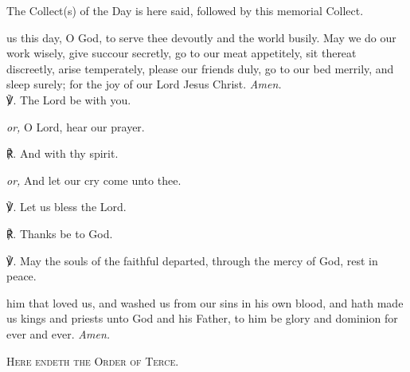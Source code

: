 \begin{multicols}{2}




\begin{rubric}
	The Collect(s) of the Day is here said, followed by this memorial Collect.
\end{rubric}

 us this day, O God, to serve thee devoutly and the world busily. May we do our work wisely, give succour secretly, go to our meat appetitely, sit thereat discreetly, arise temperately, please our friends duly, go to our bed merrily, and sleep surely; for the joy of our Lord Jesus Christ. \textit{Amen.}\\

℣. The Lord be with you.\par
\textit{or,} O Lord, hear our prayer.\par
℟. And with thy spirit.\par
\textit{or,} And let our cry come unto thee.\par
℣. Let us bless the Lord.\par
℟. Thanks be to God.\par
℣. May the souls {} of the faithful departed, through the mercy of God, rest in peace.

 him that loved us, and washed us from our sins in his own blood, and hath made us kings and priests unto God and his Father, to him be glory and dominion for ever and ever. \textit{Amen.}



\end{multicols}

\begin{center}
	{\textsc{Here endeth the Order of Terce.}}
\end{center}